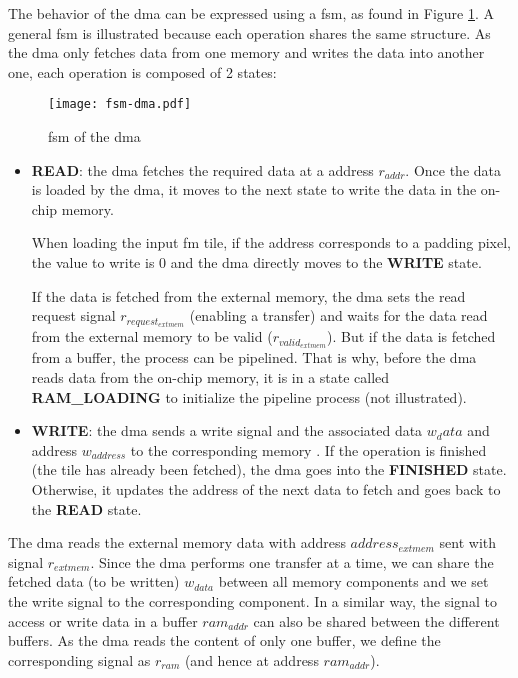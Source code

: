 The behavior of the \acrshort{dma} can be expressed using a \acrshort{fsm}, as found in Figure \ref{fig:fsm_dma}. A general \acrshort{fsm} is illustrated because each operation shares the same structure. As the \acrshort{dma} only fetches data from one memory and writes the data into another one, each operation is composed of 2 states:
%
\begin{figure}[H]
    \centering
    \texttt{[image: fsm-dma.pdf]}
    \caption{\acrshort{fsm} of the \acrshort{dma}}
    \label{fig:fsm_dma}
\end{figure}
%
\begin{itemize}
    \item \textbf{READ}: the \acrshort{dma} fetches the required data at a address $r_{addr}$. Once the data is loaded by the \acrshort{dma}, it moves to the next state to write the data in the on-chip memory. 
    
    When loading the input \acrshort{fm} tile, if the address corresponds to a padding pixel, the value to write is 0 and the \acrshort{dma} directly moves to the \textbf{WRITE} state. 
    
    If the data is fetched from the external memory, the \acrshort{dma} sets the read request signal $r_{request_{extmem}}$ (enabling a transfer) and waits for the data read from the external memory to be valid ($r_{valid_{extmem}}$). But if the data is fetched from a buffer, the process can be pipelined. That is why, before the \acrshort{dma} reads data from the on-chip memory, it is in a state called \textbf{RAM\_LOADING} to initialize the pipeline process (not illustrated).
    \item \textbf{WRITE}: the \acrshort{dma} sends a write signal and the associated data $w_data$ and address $w_{address}$ to the corresponding memory . If the operation is finished (the tile has already been fetched), the \acrshort{dma} goes into the \textbf{FINISHED} state. Otherwise, it updates the address of the next data to fetch and goes back to the \textbf{READ} state.
\end{itemize}

The \acrshort{dma} reads the external memory data with address $address_{extmem}$ sent with signal $r_{extmem}$. Since the \acrshort{dma} performs one transfer at a time, we can share the fetched data (to be written) $w_{data}$ between all memory components and we set the write signal to the corresponding component. In a similar way, the signal to access or write data in a buffer $ram_{addr}$ can also be shared between the different buffers. As the \acrshort{dma} reads the content of only one buffer, we define the corresponding signal as $r_{ram}$ (and hence at address $ram_{addr}$).
%
